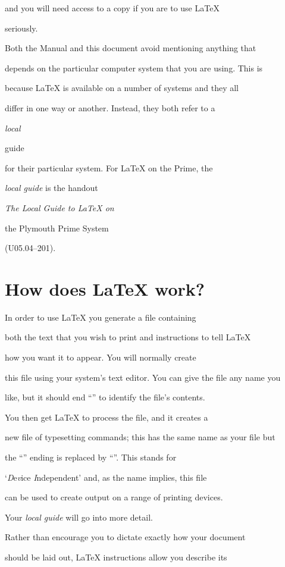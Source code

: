 and you will need access to a copy if you are to use \LaTeX{}

seriously.



Both the Manual and this document avoid mentioning anything that

depends on the particular computer system that you are using.  This is

because \LaTeX{} is available on a number of systems and they all

differ in one way or another.  Instead, they both refer to a {\em local

guide\/} for their particular system.  For \LaTeX{} on the Prime, the

{\em local guide\/} is the handout {\em The Local Guide to \LaTeX{} on

the Plymouth Prime System\/} (U05.04--201).



\section{How does \LaTeX{} work?}



In order to use \LaTeX{} you generate a file containing

both the text that you wish to print and instructions to tell \LaTeX{}

how you want it to appear.  You will normally create

this file using your system's text editor.  You can give the file any name you

like, but it should end ``'' to identify the file's contents.

You then get \LaTeX{} to process the file, and it creates a

new file of typesetting commands; this has the same name as your file but

the ``'' ending is replaced by ``''.  This stands for

`{\it D\/}e{\it v\/}ice {\it I\/}ndependent' and, as the name implies, this file

can be used to create output on a range of printing devices.

Your {\em local guide\/} will go into more detail.



Rather than encourage you to dictate exactly how your document

should be laid out, \LaTeX{} instructions allow you describe its

